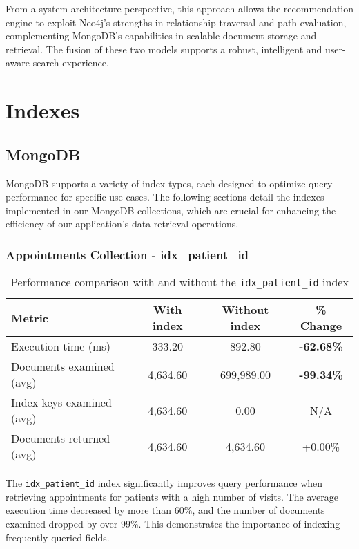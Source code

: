 From a system architecture perspective, this approach allows the recommendation engine to exploit Neo4j's strengths in relationship traversal and path evaluation, complementing MongoDB's capabilities in scalable document storage and retrieval. The fusion of these two models supports a robust, intelligent and user-aware search experience.

\section{Indexes}

\subsection{MongoDB}
MongoDB supports a variety of index types, each designed to optimize query performance for specific use cases. The following sections detail the indexes implemented in our MongoDB collections, which are crucial for enhancing the efficiency of our application's data retrieval operations.

\subsubsection{Appointments Collection - idx\_patient\_id}

\begin{table}[H]
\centering
\caption{Performance comparison with and without the \texttt{idx\_patient\_id} index}
\begin{tabular}{lccc}
\toprule
\textbf{Metric} & \textbf{With index} & \textbf{Without index} & \textbf{\% Change} \\
\midrule
Execution time (ms)         & 333.20     & 892.80     & \textbf{-62.68\%} \\
Documents examined (avg)         & 4,634.60   & 699,989.00 & \textbf{-99.34\%} \\
Index keys examined (avg)        & 4,634.60   & 0.00       & N/A \\
Documents returned (avg)         & 4,634.60   & 4,634.60   & +0.00\% \\
\bottomrule
\end{tabular}
\label{tab:patient_idx_performance_corrected}
\end{table}

The \texttt{idx\_patient\_id} index significantly improves query performance when retrieving appointments for patients with a high number of visits. The average execution time decreased by more than 60\%, and the number of documents examined dropped by over 99\%. This demonstrates the importance of indexing frequently queried fields.

